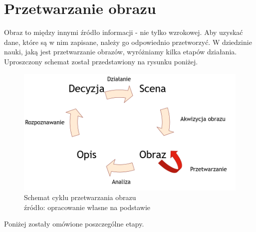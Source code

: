 \documentclass[eng,oneside]{mgr}
\begin{document}
\chapter{Przetwarzanie obrazu}
Obraz to między innymi źródło informacji - nie tylko wzrokowej. Aby uzyskać dane, które są w nim zapisane, należy go odpowiednio przetworzyć. W dziedzinie nauki, jaką jest przetwarzanie obrazów, wyróżniamy kilka etapów działania. Uproszczony schemat został przedstawiony na rysunku poniżej.
\begin{figure}[htbp]
\centering
\captionsetup{justification=centering}
\includegraphics[scale=0.5]{cyklprzetwarzania.png}
\caption{Schemat cyklu przetwarzania obrazu \\ 
źródło: opracowanie własne na podstawie \cite{rysunek}}\par\medskip
\end{figure}
\par Poniżej zostały omówione poszczególne etapy.
\end{document}
